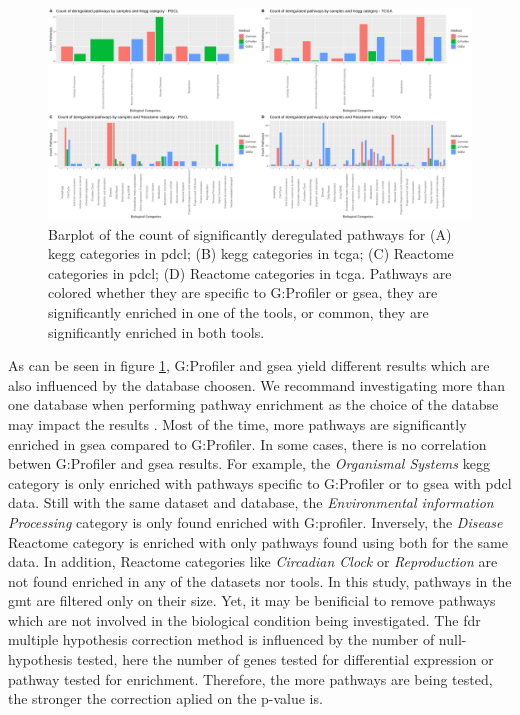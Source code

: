 \begin{figure}
    \includegraphics[width=\textwidth]{img/barplot-categ-global}
    \caption{
        Barplot of the count of significantly deregulated pathways for (A) \acrshort{kegg} categories in \acrshort{pdcl}; (B) \acrshort{kegg} categories in \acrshort{tcga}; (C) Reactome categories in \acrshort{pdcl}; (D) Reactome categories in \acrshort{tcga}.
        Pathways are colored whether they are specific to G:Profiler or \acrshort{gsea}, they are significantly enriched in one of the tools, or common, they are significantly enriched in both tools.
    }
    \label{fig:barplot-categ-global}
\end{figure}

As can be seen in figure \ref*{fig:barplot-categ-global}, G:Profiler and \acrshort{gsea} yield different results which are also influenced by the database choosen.
We recommand investigating more than one database when performing pathway enrichment as the choice of the databse may impact the results \cite*{Mubeen2019}.
Most of the time, more pathways are significantly enriched in \acrshort{gsea} compared to G:Profiler.
In some cases, there is no correlation betwen G:Profiler and \acrshort{gsea} results.
For example, the \textit{Organismal Systems} \acrshort{kegg} category is only enriched with pathways specific to G:Profiler or to \acrshort{gsea} with \acrshort{pdcl} data.
Still with the same dataset and database, the \textit{Environmental information Processing} category is only found enriched with G:profiler.
Inversely, the \textit{Disease} Reactome category is enriched with only pathways found using both for the same data.
In addition, Reactome categories like \textit{Circadian Clock} or \textit{Reproduction} are not found enriched in any of the datasets nor tools.
In this study, pathways in the \acrshort{gmt} are filtered only on their size.
Yet, it may be benificial to remove pathways which are not involved in the biological condition being investigated.
The \acrshort{fdr} multiple hypothesis correction method is influenced by the number of null-hypothesis tested, here the number of genes tested for differential expression or pathway tested for enrichment.
Therefore, the more pathways are being tested, the stronger the correction aplied on the p-value is.

